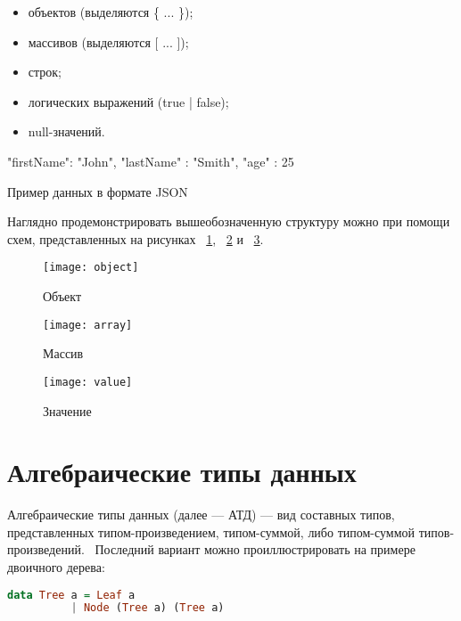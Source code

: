 \begin{itemize}
  \item объектов (выделяются \{ ... \});
  \item массивов (выделяются [ ... ]);
  \item строк;
  \item логических выражений (true | false);
  \item null-значений.
\end{itemize}

\begin{ListingEnv}[H]
\begin{Verb}
{     
    "firstName": "John",
    "lastName" : "Smith",
    "age" : 25
}
\end{Verb}
\caption{Пример данных в формате JSON}
\label{listing:jsonExample}
\end{ListingEnv}

Наглядно продемонстрировать вышеобозначенную структуру можно при помощи схем, представленных на рисунках ~\ref{fig:objectGr}, ~\ref{fig:arrayGr} и ~\ref{fig:valueGr}.

\begin{figure}[!ht]
\centering
\texttt{[image: object]}
\caption{\label{fig:objectGr}Объект}
\end{figure}

\begin{figure}[!ht]
\centering
\texttt{[image: array]}
\caption{\label{fig:arrayGr}Массив}
\end{figure}

\begin{figure}[!ht]
\centering
\texttt{[image: value]}
\caption{\label{fig:valueGr}Значение}
\end{figure}

\section{Алгебраические типы данных}

Алгебраические типы данных (далее --- АТД) --- вид составных типов, представленных типом-произведением, типом-суммой, либо типом-суммой типов-произведений.~\cite{haskellGreatGood} Последний вариант можно проиллюстрировать на примере двоичного дерева:

\begin{lstlisting}[language=Haskell]
data Tree a = Leaf a
          | Node (Tree a) (Tree a)
\end{lstlisting}

